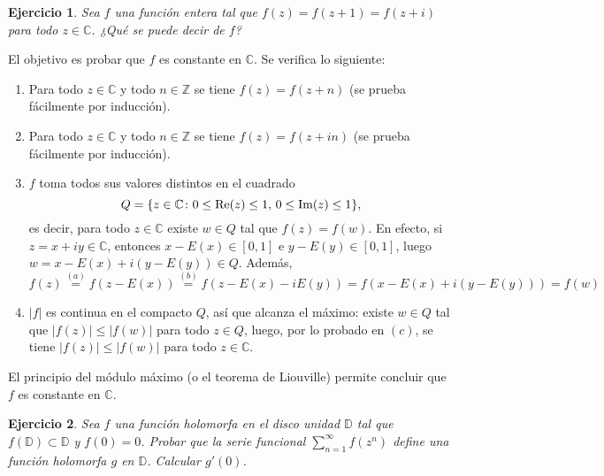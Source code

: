 \documentclass[11pt]{report}
\makeatletter
\renewenvironment{proof}[1][\proofname]{\par
  \pushQED{\qed}%
  \normalfont \topsep\z@skip %
  \trivlist
  \item[\hskip\labelsep
        \itshape
    #1\@addpunct{.}]\ignorespaces
}{%
  \popQED\endtrivlist\@endpefalse
}
\newcommand{\Z}{\mathbb Z}
\newcommand{\C}{\mathbb C}
\newcommand{\D}{\mathbb D}
\newtheorem{ejercicio}{Ejercicio}
\makeatother
\begin{document}
\begin{ejercicio}
  Sea $f$ una función entera tal que $f(z) = f(z+1) = f(z+i) $ para todo $z \in \C$. ¿Qué se puede decir de $f$?
\end{ejercicio}

\begin{proof}
  El objetivo es probar que $f$ es constante en $\C$. Se verifica lo siguiente:
  \begin{enumerate}
    \item Para todo $z \in \C$ y todo $n \in \Z$ se tiene $f(z)=f(z+n)$ (se prueba fácilmente por inducción).
    \item Para todo $z \in \C$ y todo $n \in \Z$ se tiene $f(z)=f(z+in)$ (se prueba fácilmente por inducción).
    \item $f$ toma todos sus valores distintos en el cuadrado
    \[Q = \{z \in \C \colon 0 \leq \textup{Re}(z) \leq 1, \, 0 \leq \textup{Im}(z) \leq 1\},\]
    es decir, para todo $z \in \C$ existe $w \in Q$ tal que $f(z)=f(w)$. En efecto, si $z = x+iy \in \C$, entonces $x- E(x) \in [0,1]$ e $y - E(y) \in [0,1]$, luego $w=x-E(x)+i(y-E(y)) \in Q$. Además,
    \[f(z)\overset{(a)}{=}f(z-E(x)) \overset{(b)}{=}f(z-E(x)-iE(y)) = f(x-E(x)+i(y-E(y))) = f(w)\]
    \item $|f|$ es continua en el compacto $Q$, así que alcanza el máximo: existe $w \in Q$ tal que $|f(z)| \leq |f(w)|$ para todo $z \in Q$, luego, por lo probado en $(c)$, se tiene $|f(z)| \leq |f(w)|$ para todo $z \in \C$.
  \end{enumerate}
  El principio del módulo máximo (o el teorema de Liouville) permite concluir que $f$ es constante en $\C$.
\end{proof}

\begin{ejercicio}
  Sea $f$ una función holomorfa en el disco unidad $\D$ tal que $f(\D) \subset \D$ y $f(0)=0$. Probar que la serie funcional $\sum_{n=1}^\infty f(z^n)$ define una función holomorfa $g$ en $\D$. Calcular $g'(0)$.
\end{ejercicio}
\end{document}
